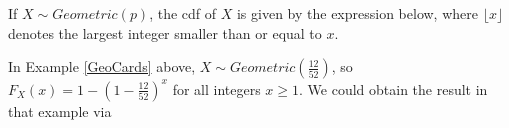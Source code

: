 \begin{prop}
If $X \sim Geometric(p)$, the cdf of $X$ is given by the expression below, where $\lfloor x \rfloor$ denotes the largest integer smaller than or equal to $x$.
\renewcommand*{\arraystretch}{1.35}
\renewcommand*{\arraystretch}{1}
\end{prop}


\par In Example \ref{GeoCards} above, $X \sim Geometric(\frac{12}{52})$, so $F_X(x) = 1 - (1-\frac{12}{52})^{x}$ for all integers $x \geq 1$. We could obtain the result in that example via

